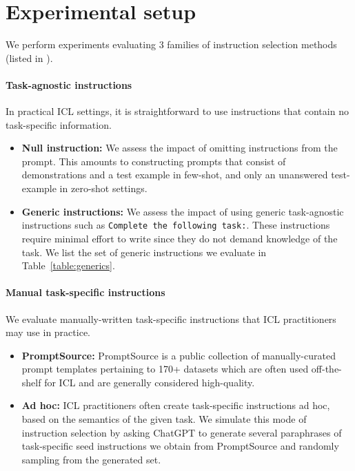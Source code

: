 \section{Experimental setup}
\label{sec:experimental_setup}
\label{sec:results}
We perform experiments evaluating 3 families of instruction selection methods (listed in ). 

\paragraph{Task-agnostic instructions}
In practical ICL settings, it is straightforward to use instructions that contain no task-specific information.
\begin{itemize}[leftmargin=*]
    \item \textbf{Null instruction:} We assess the impact of omitting instructions from the prompt. This amounts to constructing prompts that consist of demonstrations and a test example in few-shot, and only an unanswered test-example in zero-shot settings.
    
    \item \textbf{Generic instructions:} We assess the impact of using generic task-agnostic instructions such as \texttt{Complete the following task:}. These instructions require minimal effort to write since they do not demand knowledge of the task. We list the set of generic instructions we evaluate in Table~\ref{table:generics}.
\end{itemize}

\paragraph{Manual task-specific instructions} 

We evaluate manually-written task-specific instructions that ICL practitioners may use in practice.

\begin{itemize}[leftmargin=*]
    \item \textbf{PromptSource:} PromptSource \cite{promptsource} is a public collection of manually-curated prompt templates pertaining to 170+ datasets which are often used off-the-shelf for ICL and are generally considered high-quality.
    
    \item \textbf{Ad hoc:} 
    ICL practitioners often create task-specific instructions ad hoc, based on the semantics of the given task. We simulate this mode of instruction selection by asking ChatGPT to generate several paraphrases of task-specific seed instructions we obtain from PromptSource and randomly sampling from the generated set.
    
\end{itemize}


